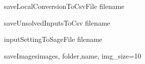 \begin{method}{saveLocalConversionToCsvFile}{ filename}

\end{method}


\begin{method}{saveUnsolvedInputsToCsv}{ filename}

\end{method}


\begin{method}{inputSettingToSageFile}{ filename}

\end{method}


\begin{method}{saveImages}{images, folder,name, img\_size=10}

\end{method}
